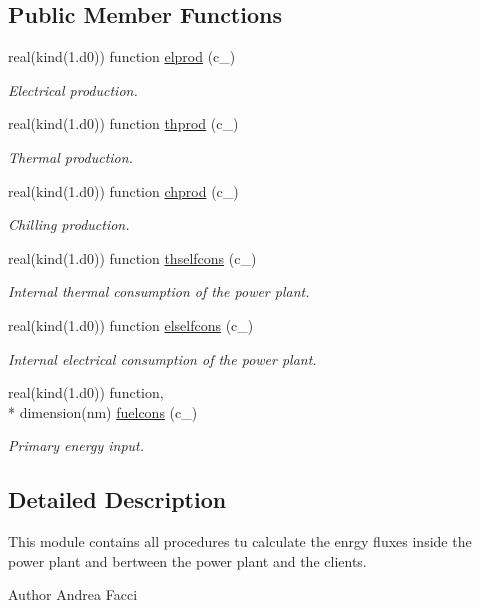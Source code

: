 \subsection*{Public Member Functions}
\begin{DoxyCompactItemize}
\item 
real(kind(1.d0)) function \hyperlink{classenergy_a0c7a79d68b0fd7f46b1bf0930ba12e49}{elprod} (c\-\_\-)
\begin{DoxyCompactList}\small\item\em Electrical production. \end{DoxyCompactList}\item 
real(kind(1.d0)) function \hyperlink{classenergy_a65fb81fffe7a7a232c1633fd0efc734a}{thprod} (c\-\_\-)
\begin{DoxyCompactList}\small\item\em Thermal production. \end{DoxyCompactList}\item 
real(kind(1.d0)) function \hyperlink{classenergy_afe20a23049f6d8f45669c9976b4adf95}{chprod} (c\-\_\-)
\begin{DoxyCompactList}\small\item\em Chilling production. \end{DoxyCompactList}\item 
real(kind(1.d0)) function \hyperlink{classenergy_a8293f2861341c8b138b8040574c6b430}{thselfcons} (c\-\_\-)
\begin{DoxyCompactList}\small\item\em Internal thermal consumption of the power plant. \end{DoxyCompactList}\item 
real(kind(1.d0)) function \hyperlink{classenergy_a954e362be8eef1d3225b239a0b1a62eb}{elselfcons} (c\-\_\-)
\begin{DoxyCompactList}\small\item\em Internal electrical consumption of the power plant. \end{DoxyCompactList}\item 
real(kind(1.d0)) function, \\*
dimension(nm) \hyperlink{classenergy_a9c457633e13afce0389b12b6758286b8}{fuelcons} (c\-\_\-)
\begin{DoxyCompactList}\small\item\em Primary energy input. \end{DoxyCompactList}\end{DoxyCompactItemize}


\subsection{Detailed Description}
This module contains all procedures tu calculate the enrgy fluxes inside the power plant and bertween the power plant and the clients. \begin{DoxyAuthor}{Author}
Andrea Facci 
\end{DoxyAuthor}


